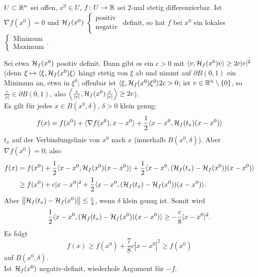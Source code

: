 \begin{satz}
	$ U\subset\mathbb{R}^n $ sei offen, $ x^0\in U $, $ f\colon U\rightarrow\mathbb{R} $ sei 2-mal stetig differenzierbar. Ist $ \nabla f(x^0)=0 $ und $ \mathcal H_f(x^0) $ $ \begin{cases}
	\text{positiv}\\\text{negativ}
	\end{cases} $ definit, so hat $ f $ bei $ x^0 $ ein lokales $ \begin{cases}
	\text{Minimum}\\\text{Maximum}
	\end{cases} $.
\end{satz}
\begin{beweis}
	Sei etwa $ \mathcal H_f(x^0) $ positiv definit. Dann gibt es ein $ c>0 $ mit $ \langle v,\mathcal H_f(x^0)v\rangle\geq 2c|v|^2 $ (denn $ \xi\mapsto\langle\xi,\mathcal H_f(x^0)\xi\rangle $ h\"angt stetig von $ \xi $ ab und nimmt auf $ \partial B(0,1) $ ein Minimum an, etwa in $ \xi^0 $; offenbar ist $ \langle\xi,\mathcal H_f(x^0)\xi^0\rangle 2c>0 $; ist $ v\in\mathbb{R}^n\setminus\lbrace 0\rbrace $, so $ \frac{v}{|v|}\in\partial B(0,1) $, also $ \left\langle\frac{v}{|v|},\mathcal H_f(x^0)\frac{v}{|v|}\right\rangle\geq 2c$).\\
	Es gilt f\"ur jedes $ x\in B(x^0,\delta) $, $ \delta>0 $ klein genug:
	\[ f(x)=f(x^0)+\langle\nabla f(x^0),x-x^0\rangle+\frac{1}{2}\langle x-x^0,\mathcal H_f(t_x)(x-x^0)\rangle \]
	$ t_x $ auf der Verbindungslinie von $ x^0 $ nach $ x $ (innerhalb $ B(x^0,\delta) $). Aber $ \nabla f(x^0)=0 $; also
	\begin{align*} f(x)&=f(x^0)+\frac{1}{2}\langle x-x^0,\mathcal H_f(x^0)(x-x^0)\rangle+\frac{1}{2}\langle x-x^0,(\mathcal H_f(t_x)-\mathcal H_f(x^0))(x-x^0)\rangle\\&\geq f(x^0)+c|x-x^0|^2+\frac{1}{2}\langle x-x^0,(\mathcal H_f(t_x)-\mathcal H_f(x^0))(x-x^0)\rangle. \end{align*}
	Aber $ \left\|\mathcal H_f(t_x)-\mathcal H_f(x^0)\right\|\leq\frac{c}{4} $, wenn $ \delta $ klein genug ist. Somit wird \[ \frac{1}{2}\langle x-x^0,(\mathcal H_f(t_x)-\mathcal H_f(x^0))(x-x^0)\rangle\geq-\frac{c}{8}|x-x^0|^2. \]
	Es folgt
	\[ f(x)\geq f(x^0)+\frac{7}{8}c|x-x^0|^2\geq f(x^0) \]
	auf $ B(x^0,\delta) $.\\
	Ist $ \mathcal H_f(x^0) $ negativ-definit, wiederhole Argument f\"ur $ -f $.
\end{beweis}
